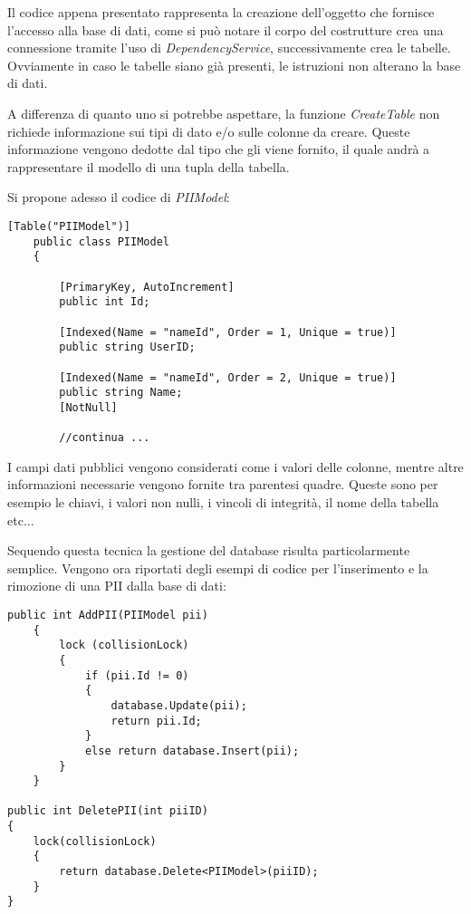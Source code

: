 Il codice appena presentato rappresenta la creazione dell'oggetto che fornisce l'accesso alla base di dati, come si può notare il corpo del costrutture crea una connessione tramite l'uso di \emph{DependencyService}, successivamente crea le tabelle. Ovviamente in caso le tabelle siano già presenti, le istruzioni non alterano la base di dati. 

A differenza di quanto uno si potrebbe aspettare, la funzione \emph{CreateTable} non richiede informazione sui tipi di dato e/o sulle colonne da creare. Queste informazione vengono dedotte dal tipo che gli viene fornito, il quale andrà a rappresentare il modello di una tupla della tabella.

Si propone adesso il codice di \emph{PIIModel}:
\begin{lstlisting}[caption={codice PIIModel}]
    [Table("PIIModel")]
    public class PIIModel
    {
 
        [PrimaryKey, AutoIncrement]
        public int Id;
        
        [Indexed(Name = "nameId", Order = 1, Unique = true)]
        public string UserID;

        [Indexed(Name = "nameId", Order = 2, Unique = true)]
        public string Name;
        [NotNull]

        //continua ...
\end{lstlisting}

I campi dati pubblici vengono considerati come i valori delle colonne, mentre altre informazioni necessarie vengono fornite tra parentesi quadre. Queste sono per esempio le chiavi, i valori non nulli, i vincoli di integrità, il nome della tabella etc...

Sequendo questa tecnica la gestione del database risulta particolarmente semplice. Vengono ora riportati degli esempi di codice per l'inserimento e la rimozione di una PII dalla base di dati:

\begin{lstlisting}[caption={codice aggiunta e rimozione PIIModel}]
public int AddPII(PIIModel pii)
    {
        lock (collisionLock)
        {
            if (pii.Id != 0)
            {
                database.Update(pii);
                return pii.Id;
            }
            else return database.Insert(pii);      
        }
    }

public int DeletePII(int piiID)
{
    lock(collisionLock)
    {
        return database.Delete<PIIModel>(piiID);
    }
}
\end{lstlisting}


